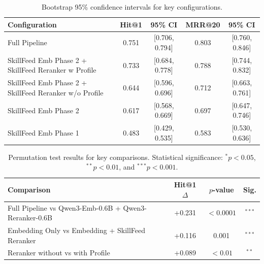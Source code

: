\documentclass[letterpaper]{article} %
\begin{document}



\begin{table}[!htbp]
\centering
\caption{Bootstrap 95\% confidence intervals for key configurations.}
\label{tab:bootstrap_ci}
\begin{tabular}{l c c c c}
\toprule
\textbf{Configuration} & \textbf{Hit@1} & \textbf{95\% CI} & \textbf{MRR@20} & \textbf{95\% CI} \\
\midrule
Full Pipeline & 0.751 & [0.706, 0.794] & 0.803 & [0.760, 0.846] \\
SkillFeed Emb Phase 2 + SkillFeed Reranker w Profile & 0.733 & [0.684, 0.778] & 0.788 & [0.744, 0.832] \\
SkillFeed Emb Phase 2 + SkillFeed Reranker w/o Profile & 0.644 & [0.596, 0.696] & 0.712 & [0.663, 0.761] \\
SkillFeed Emb Phase 2  & 0.617 & [0.568, 0.669] & 0.697 & [0.647, 0.746] \\
SkillFeed Emb Phase 1 & 0.483 & [0.429, 0.535] & 0.583 & [0.530, 0.636] \\
\bottomrule
\end{tabular}%
\end{table}

\begin{table}[!htbp]
\centering
\caption[Permutation test results for key comparisons.]{
Permutation test results for key comparisons.
Statistical significance: $^{*}p<0.05$, $^{**}p<0.01$, and $^{***}p<0.001$.
}
\label{tab:permutation_test}
\begin{tabular}{l c c c}
\toprule
\textbf{Comparison}
& \textbf{Hit@1 $\Delta$}
& \textbf{$p$-value}
& \textbf{Sig.} \\
\midrule

Full Pipeline vs Qwen3-Emb-0.6B + Qwen3-Reranker-0.6B
& +0.231 & $<0.0001$ & $^{***}$ \\

Embedding Only vs Embedding + SkillFeed Reranker
& +0.116 & 0.001 & $^{***}$ \\

Reranker without vs with Profile
& +0.089 & $<0.01$ & $^{**}$ \\

\bottomrule
\end{tabular}%
\end{table}
% 
\end{document}
